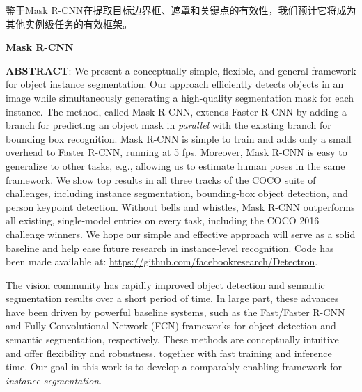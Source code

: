 鉴于Mask R-CNN在提取目标边界框、遮罩和关键点的有效性，我们预计它将成为其他实例级任务的有效框架。





\begin{center}
    \sihao\textbf{Mask R-CNN}
\end{center}

\textbf{ABSTRACT}: We present a conceptually simple, flexible, and general framework for object instance segmentation. Our approach efficiently detects objects in an image while simultaneously generating a high-quality segmentation mask for each instance. The method, called Mask R-CNN, extends Faster R-CNN by adding a branch for predicting an object mask in \emph{parallel} with the existing branch for bounding box recognition. Mask R-CNN is simple to train and adds only a small overhead to Faster R-CNN, running at 5 fps. Moreover, Mask R-CNN is easy to generalize to other tasks, e.g., allowing us to estimate human poses in the same framework. We show top results in all three tracks of the COCO suite of challenges, including instance segmentation, bounding-box object detection, and person keypoint detection. Without bells and whistles, Mask R-CNN outperforms all existing, single-model entries on every task, including the COCO 2016 challenge winners. We hope our simple and effective approach will serve as a solid baseline and help ease future research in instance-level recognition. Code has been made available at: \url{https://github.com/facebookresearch/Detectron}.


The vision community has rapidly improved object detection and semantic segmentation results over a short period of time. In large part, these advances have been driven by powerful baseline systems, such as the Fast/Faster R-CNN and Fully Convolutional Network (FCN) frameworks for object detection and semantic segmentation, respectively. These methods are conceptually intuitive and offer flexibility and robustness, together with fast training and inference time. Our goal in this work is to develop a comparably enabling framework for \emph{instance segmentation}.

